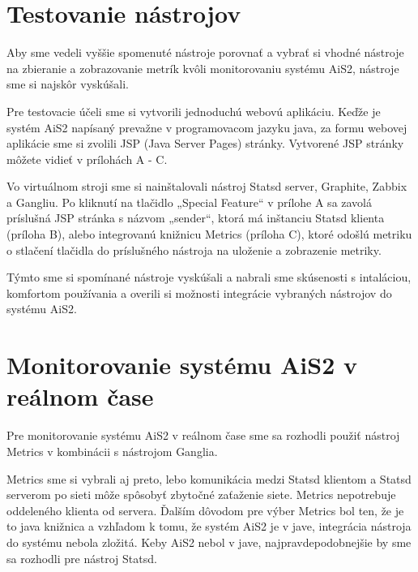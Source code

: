 \documentclass[a4paper, upjsfrontpage, disablespecwarning, thesismargins, thesislinespacing]{rnthesis}
\begin{document}
\section{Testovanie nástrojov}

Aby sme vedeli vyššie spomenuté nástroje porovnať a vybrať si vhodné nástroje na zbieranie a zobrazovanie metrík kvôli monitorovaniu systému AiS2, nástroje sme si najskôr vyskúšali.

Pre testovacie účeli sme si vytvorili jednoduchú webovú aplikáciu.
Keďže je systém AiS2 napísaný prevažne v programovacom jazyku java, za formu webovej aplikácie sme si zvolili JSP (Java Server Pages) stránky.
Vytvorené JSP stránky môžete vidieť v prílohách A - C.

Vo virtuálnom stroji sme si nainštalovali nástroj Statsd server, Graphite, Zabbix a Gangliu.
Po kliknutí na tlačidlo „Special Feature“ v prílohe A sa zavolá príslušná JSP stránka s názvom „sender“, ktorá má inštanciu Statsd klienta (príloha B), alebo integrovanú knižnicu Metrics (príloha C), ktoré odošlú metriku o stlačení tlačidla do príslušného nástroja na uloženie a zobrazenie metriky.

Týmto sme si spomínané nástroje vyskúšali a nabrali sme skúsenosti s intaláciou, komfortom používania a overili si možnosti integrácie vybraných nástrojov do systému AiS2.



\section{Monitorovanie systému AiS2 v reálnom čase}

Pre monitorovanie systému AiS2 v reálnom čase sme sa rozhodli použiť nástroj Metrics v kombinácii s nástrojom Ganglia.

Metrics sme si vybrali aj preto, lebo komunikácia medzi Statsd klientom a Statsd serverom po sieti môže spôsobyť zbytočné zaťaženie siete.
Metrics nepotrebuje oddeleného klienta od servera.
Ďalším dôvodom pre výber Metrics bol ten, že je to java knižnica a vzhľadom k tomu, že systém AiS2 je v jave, integrácia nástroja do systému nebola zložitá.
Keby AiS2 nebol v jave, najpravdepodobnejšie by sme sa rozhodli pre nástroj Statsd.
\end{document}
